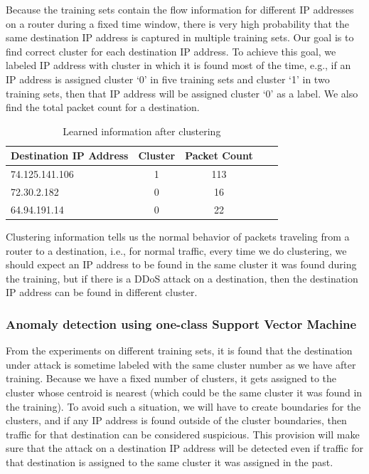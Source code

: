\documentclass[12pt,oneside,a4paper]{article}
\begin{document}
Because the training sets contain the flow information for different IP addresses on a router during a fixed time window, there is very high probability that the same destination IP address is captured in multiple training sets. Our goal is to find correct cluster for each destination IP address. To achieve this goal, we labeled IP address with cluster in which it is found most of the time, e.g., if an IP address is assigned cluster `0' in five training sets and cluster `1' in two training sets, then that IP address will be assigned cluster `0' as a label. We also find the total packet count for a destination.

\begin{table}[H]
\centering
  \begin{tabular}{| l | c | c | c | c |}
    \hline
    {Destination IP Address}  &Cluster  &Packet Count \\
    \hline
    74.125.141.106  & 1     & 113  \\ \hline
    72.30.2.182     & 0     & 16   \\ \hline
    64.94.191.14    & 0     & 22   \\ \hline
  \end{tabular}
\caption{Learned information after clustering} \label{table:learned-clustering}
\end{table}

Clustering information tells us the normal behavior of packets traveling from a router to a destination, i.e., for normal traffic, every time we do clustering, we should expect an IP address to be found in the same cluster it was found during the training, but if there is a DDoS attack on a destination, then the destination IP address can be found in different cluster.

\subsubsection{Anomaly detection using one-class Support Vector Machine} \label{subsec:Anomaly_Detection}

From the experiments on different training sets, it is found that the destination under attack is sometime labeled with the same cluster number as we have after training. Because we have a fixed number of clusters, it gets assigned to the cluster whose centroid is nearest (which could be the same cluster it was found in the training). To avoid such a situation, we will have to create boundaries for the clusters, and if any IP address is found outside of the cluster boundaries, then traffic for that destination can be considered suspicious. This provision will make sure that the attack on a destination IP address will be detected even if traffic for that destination is assigned to the same cluster it was assigned in the past.
\end{document}
